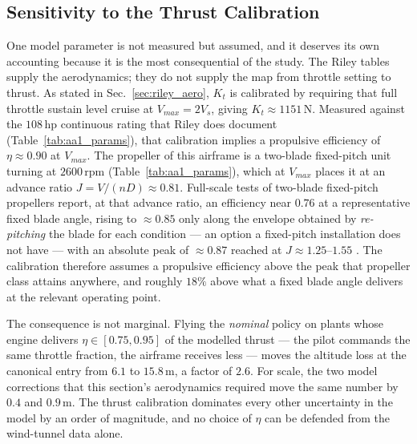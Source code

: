 \subsection{Sensitivity to the Thrust Calibration}
\label{sec:thrust_sensitivity}

One model parameter is not measured but assumed, and it deserves its
own accounting because it is the most consequential of the study. The
Riley tables supply the aerodynamics; they do not supply the map from
throttle setting to thrust. As stated in Sec.~\ref{sec:riley_aero},
$K_t$ is calibrated by requiring that full throttle sustain level
cruise at $V_{max} = 2V_s$, giving $K_t \approx 1151$\,N. Measured
against the $108$\,hp continuous rating that Riley does document
(Table~\ref{tab:aa1_params}), that calibration implies a propulsive
efficiency of $\eta \approx 0.90$ at $V_{max}$. The propeller of this
airframe is a two-blade fixed-pitch unit turning at $2600$\,rpm
(Table~\ref{tab:aa1_params}), which at $V_{max}$ places it at an advance
ratio $J = V/(nD) \approx 0.81$. Full-scale tests of two-blade
fixed-pitch propellers report, at that advance ratio, an efficiency near
$0.76$ at a representative fixed blade angle, rising to $\approx 0.85$
only along the envelope obtained by \emph{re-pitching} the blade for
each condition --- an option a fixed-pitch installation does not have
--- with an absolute peak of $\approx 0.87$ reached at
$J \approx 1.25$--$1.55$ \cite{HartmanBiermann1938}. The calibration
therefore assumes a propulsive efficiency above the peak that propeller
class attains anywhere, and roughly $18\%$ above what a fixed blade
angle delivers at the relevant operating point.

The consequence is not marginal. Flying the \emph{nominal} policy on
plants whose engine delivers $\eta \in [0.75, 0.95]$ of the modelled
thrust --- the pilot commands the same throttle fraction, the airframe
receives less --- moves the altitude loss at the canonical entry from
$6.1$ to $15.8$\,m, a factor of $2.6$. For scale, the two model
corrections that this section's aerodynamics required move the same
number by $0.4$ and $0.9$\,m. The thrust calibration dominates every
other uncertainty in the model by an order of magnitude, and no choice
of $\eta$ can be defended from the wind-tunnel data alone.

